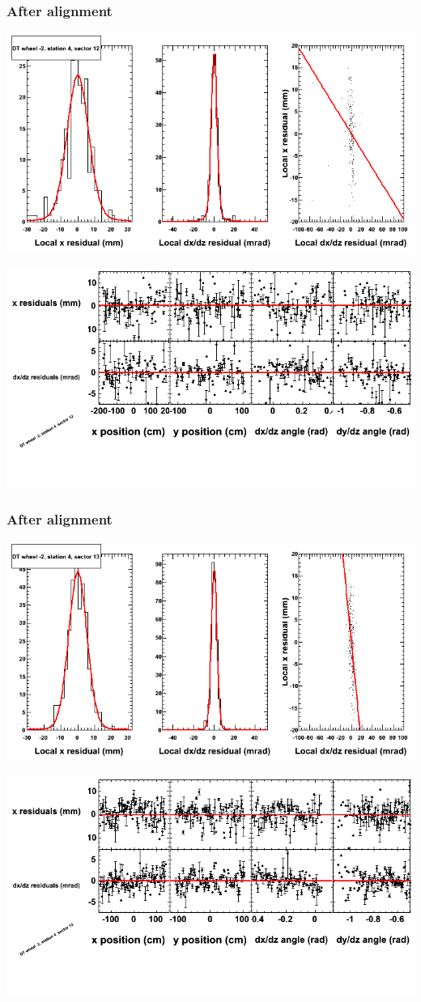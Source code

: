 \documentclass[compress]{beamer}
\begin{document}
\begin{frame}
\frametitle{After alignment}
\includegraphics[width=0.7\linewidth]{NOV4_fitfunctions/MBwhAst4sec12_bellcurves.png}

\includegraphics[width=0.7\linewidth]{NOV4_fitfunctions/MBwhAst4sec12_polynomials.png}
\end{frame}

\begin{frame}
\frametitle{After alignment}
\includegraphics[width=0.7\linewidth]{NOV4_fitfunctions/MBwhAst4sec13_bellcurves.png}

\includegraphics[width=0.7\linewidth]{NOV4_fitfunctions/MBwhAst4sec13_polynomials.png}
\end{frame}
\end{document}

